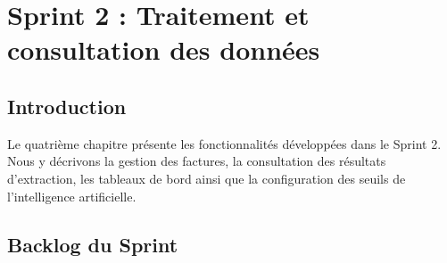 \chapter{Sprint 2 : Traitement et consultation des données}
\newpage
\section{Introduction}

Le quatrième chapitre présente les fonctionnalités développées dans le Sprint 2. Nous y décrivons la gestion des factures, la consultation des résultats d’extraction, les tableaux de bord ainsi que la configuration des seuils de l’intelligence artificielle.

\section{Backlog du Sprint}

\renewcommand{\arraystretch}{1.25}

